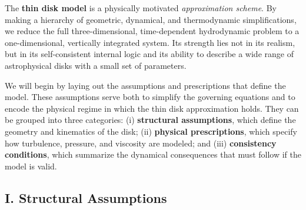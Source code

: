 \begin{bigidea}
The \textbf{thin disk model} is a physically motivated \emph{approximation scheme}. By making a hierarchy of geometric, dynamical, and thermodynamic simplifications, we reduce the full three-dimensional, time-dependent hydrodynamic problem to a one-dimensional, vertically integrated system. Its strength lies not in its realism, but in its self-consistent internal logic and its ability to describe a wide range of astrophysical disks with a small set of parameters.
\end{bigidea}

We will begin by laying out the assumptions and prescriptions that define the model. These assumptions serve both to simplify the governing equations and to encode the physical regime in which the thin disk approximation holds. They can be grouped into three categories: (i) \textbf{structural assumptions}, which define the geometry and kinematics of the disk;  (ii) \textbf{physical prescriptions}, which specify how turbulence, pressure, and viscosity are modeled; and (iii) \textbf{consistency conditions}, which summarize the dynamical consequences that must follow if the model is valid.

\subsection{I. Structural Assumptions}


